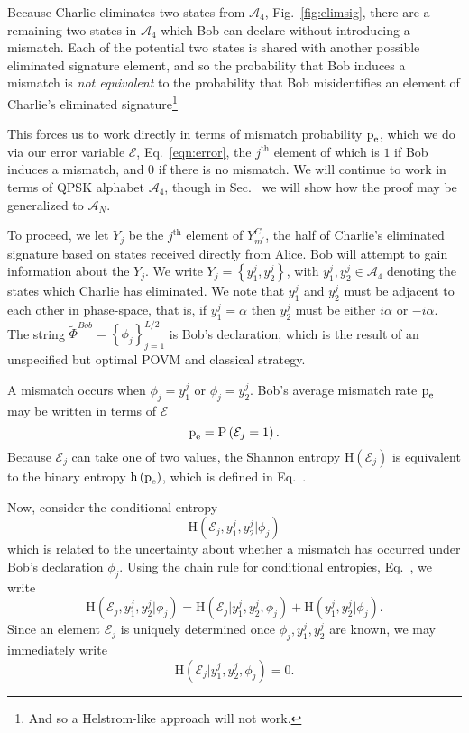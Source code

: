 Because Charlie eliminates two states from $\mathcal{A}_4$, Fig.~\ref{fig:elimsig}, there are a remaining two states in $\mathcal{A}_4$ which Bob can declare without introducing a mismatch. Each of the potential two states is shared with another possible eliminated signature element, and so the probability that Bob induces a mismatch is \emph{not equivalent} to the probability that Bob misidentifies an element of Charlie's eliminated signature\footnote{And so a Helstrom-like approach  will not work.}

This forces us to work directly in terms of mismatch probability $\text{p}_{\text{e}}$, which we do via our error variable $\mathcal{E}$, Eq.~\ref{eqn:error}, the $j^{\text{th}}$ element of which is $1$ if Bob induces a mismatch, and $0$ if there is no mismatch. We will continue to work in terms of QPSK alphabet $\mathcal{A}_4$, though in Sec.~ we will show how the proof may be generalized to $\mathcal{A}_N$.

To proceed, we let $Y_j$ be the $j^{\text{th}}$ element of $Y_{m^\prime}^C$, the half of Charlie's eliminated signature based on states received directly from Alice. Bob will attempt to gain information about the $Y_j$. We write $Y_j = \left\{y_1^j, y_2^j\right\}$, with $y_1^j, y_2^j \in \mathcal{A}_4$ denoting the states which Charlie has eliminated. We note that $y_1^j$ and $y_2^j$ must be adjacent to each other in phase-space, that is, if $y_1^j = \alpha$ then $y_2^j$ must be either $i \alpha$ or $- i \alpha$. The string $\tilde{\Phi}^{Bob} = \left\{\phi_j\right\}_{j=1}^{L/2}$ is Bob's declaration, which is the result of an unspecified but optimal POVM and classical strategy.

A mismatch occurs when $\phi_j = y_1^j$ or $\phi_j = y_2^j$. Bob's average mismatch rate $\text{p}_{\text{e}}$ may be written in terms of $\mathcal{E}$
\begin{equation}
\text{p}_{\text{e}} = \text{P}\left(\mathcal{E}_j = 1\right).
\end{equation}
Because $\mathcal{E}_j$ can take one of two values, the Shannon entropy $\text{H}\left(\mathcal{E}_j\right)$ is equivalent to the binary entropy $\text{h}\left(\text{p}_{\text{e}}\right)$, which is defined in Eq.~. %

Now, consider the conditional entropy
\begin{equation}
\text{H}\left(\mathcal{E}_j, y_1^j, y_2^j | \phi_j\right)
\end{equation}
which is related to the uncertainty about whether a mismatch has occurred under Bob's declaration $\phi_j$. Using the chain rule for conditional entropies, Eq.~, we write
\begin{equation}\label{eqn:qds_pe_deriv_1}
\text{H}\left( \mathcal{E}_j, y_1^j, y_2^j | \phi_j \right) = 
\text{H}\left( \mathcal{E}_j | y_1^j, y_2^j, \phi_j\right) + 
\text{H}\left( y_1^j, y_2^j | \phi_j\right).
\end{equation}
Since an element $\mathcal{E}_j$ is uniquely determined once $\phi_j, y_1^j, y_2^j$ are known, we may immediately write
\begin{equation}
\text{H}\left( \mathcal{E}_j | y_1^j, y_2^j, \phi_j\right) = 0.
\end{equation}

